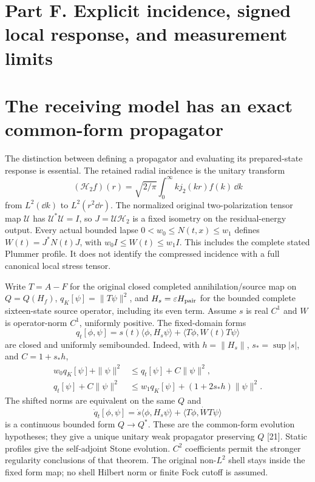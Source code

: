 \section*{Part F. Explicit incidence, signed local response, and measurement limits}
\section{The receiving model has an exact common-form propagator}
\label{sec:closure-common-form}
The distinction between defining a propagator and evaluating its prepared-state
response is essential. The retained radial incidence is the unitary transform
\[
 (\mathcal H_2f)(r)=\sqrt{2/\pi}\int_0^\infty k j_2(kr)f(k)\,\dd k
\]
from $L^2(\dd k)$ to $L^2(r^2\dd r)$. The normalized original two-polarization
tensor map $\mathcal U$ has $\mathcal U^*\mathcal U=I$, so
$J=\mathcal U\mathcal H_2$ is a fixed isometry on the residual-energy output.
Every actual bounded lapse $0<w_0\le N(t,x)\le w_1$ defines
$W(t)=J^*N(t)J$, with $w_0I\le W(t)\le w_1I$.
This includes the complete stated Plummer profile. It does not identify
the compressed incidence with a full canonical local stress tensor.

Write $T=A-F$ for the original closed completed annihilation/source map on
$Q=Q(H_f)$, $q_K[\psi]=\|T\psi\|^2$, and $H_s=\varepsilon H_{\rm pair}$
for the bounded complete sixteen-state source operator, including its even term.
Assume $s$ is real $C^1$ and $W$ is operator-norm $C^1$, uniformly positive.
The fixed-domain forms
\[
 q_t[\phi,\psi]=s(t)\langle\phi,H_s\psi\rangle
                    +\langle T\phi,W(t)T\psi\rangle
\]
are closed and uniformly semibounded. Indeed, with
$h=\|H_s\|$, $s_* =\sup|s|$, and $C=1+s_*h$,
\begin{align}
 w_0q_K[\psi]+\|\psi\|^2
 &\le q_t[\psi]+C\|\psi\|^2,\\
 q_t[\psi]+C\|\psi\|^2
 &\le w_1q_K[\psi]+(1+2s_*h)\|\psi\|^2.
\end{align}
The shifted norms are equivalent on the same $Q$ and
\[
 \dot q_t[\phi,\psi]=\dot s\langle\phi,H_s\psi\rangle
                         +\langle T\phi,\dot W T\psi\rangle
\]
is a continuous bounded form $Q\to Q^*$. These are the common-form
evolution hypotheses; they give a unique unitary weak propagator preserving
$Q$ [21]. Static profiles give the self-adjoint Stone evolution. $C^2$
coefficients permit the stronger regularity conclusions of that theorem.
The original non-$L^2$ shell stays inside the fixed form map; no shell
Hilbert norm or finite Fock cutoff is assumed.

